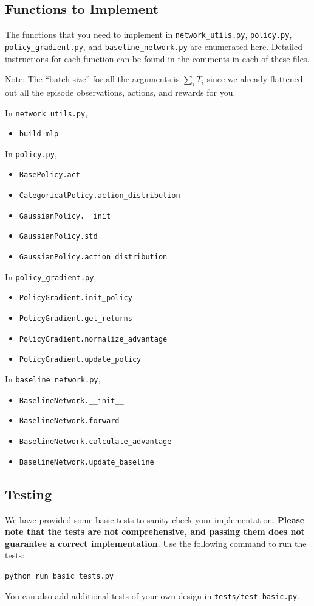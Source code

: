 \documentclass[11pt]{article}
\theoremstyle{case}
\begin{document}
\subsection{Functions to Implement}
The functions that you need to implement in \texttt{network\_utils.py}, \texttt{policy.py}, \texttt{policy\_gradient.py}, and \texttt{baseline\_network.py} are enumerated here. Detailed instructions for each function can be found in the comments in each of these files.

Note: The ``batch size'' for all the arguments is $\sum _i T_i$ since we already flattened out all the episode observations, actions, and rewards for you.

In \texttt{network\_utils.py},
\begin{itemize}
\item \texttt{build\_mlp}
\end{itemize}

In \texttt{policy.py},
\begin{itemize}
\item \texttt{BasePolicy.act}
\item \texttt{CategoricalPolicy.action\_distribution}
\item \texttt{GaussianPolicy.\_\_init\_\_}
\item \texttt{GaussianPolicy.std}
\item \texttt{GaussianPolicy.action\_distribution}
\end{itemize}

In \texttt{policy\_gradient.py},
\begin{itemize}
\item \texttt{PolicyGradient.init\_policy}
\item \texttt{PolicyGradient.get\_returns}
\item \texttt{PolicyGradient.normalize\_advantage}
\item \texttt{PolicyGradient.update\_policy}
\end{itemize}

In \texttt{baseline\_network.py},
\begin{itemize}
\item \texttt{BaselineNetwork.\_\_init\_\_}
\item \texttt{BaselineNetwork.forward}
\item \texttt{BaselineNetwork.calculate\_advantage}
\item \texttt{BaselineNetwork.update\_baseline}
\end{itemize}

\subsection{Testing}
We have provided some basic tests to sanity check your implementation. \textbf{Please note that the tests are not comprehensive, and passing them does not guarantee a correct implementation}. Use the following command to run the tests:
\begin{verbatim}
python run_basic_tests.py
\end{verbatim}
You can also add additional tests of your own design in \texttt{tests/test\_basic.py}.
\end{document}
